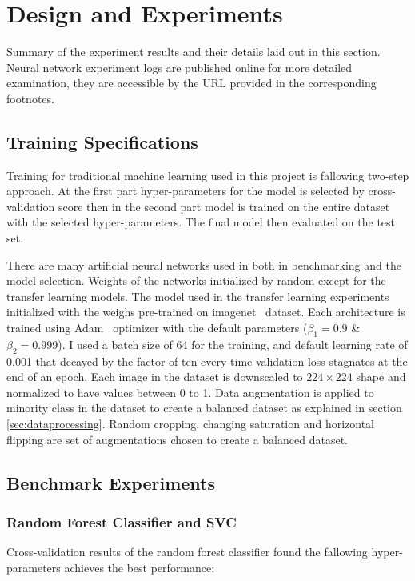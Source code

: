 \chapter{Design and Experiments} \label{chap:experiments}
Summary of the experiment results and their details laid out in this section.
Neural network experiment logs are published online for more detailed examination, they are accessible by the URL provided in the corresponding footnotes.

\section{Training Specifications} \label{sec:trainspec}
Training for traditional machine learning used in this project is fallowing two-step approach.
At the first part hyper-parameters for the model is selected by cross-validation score then in the second part model is trained on the entire dataset with the selected hyper-parameters.
The final model then evaluated on the test set.

There are many artificial neural networks used in both in benchmarking and the model selection.
Weights of the networks initialized by random except for the transfer learning models.
The model used in the transfer learning experiments initialized with the weighs pre-trained on imagenet~\cite{imagenet} dataset.
Each architecture is trained using Adam~\cite{adam} optimizer with the default parameters ($\beta_1 = 0.9$ \& $\beta_2 = 0.999$).
I used a batch size of 64 for the training, and default learning rate of 0.001 that decayed by the factor of ten every time validation loss stagnates at the end of an epoch.
Each image in the dataset is downscaled to $224 \times 224$ shape and normalized to have values between 0 to 1.
Data augmentation is applied to minority class in the dataset to create a balanced dataset as explained in section \ref{sec:dataprocessing}.
Random cropping, changing saturation and horizontal flipping are set of augmentations chosen to create a balanced dataset.



\section{Benchmark Experiments}

\subsection{Random Forest Classifier and SVC}
Cross-validation results of the random forest classifier found the fallowing hyper-parameters achieves the best performance:

